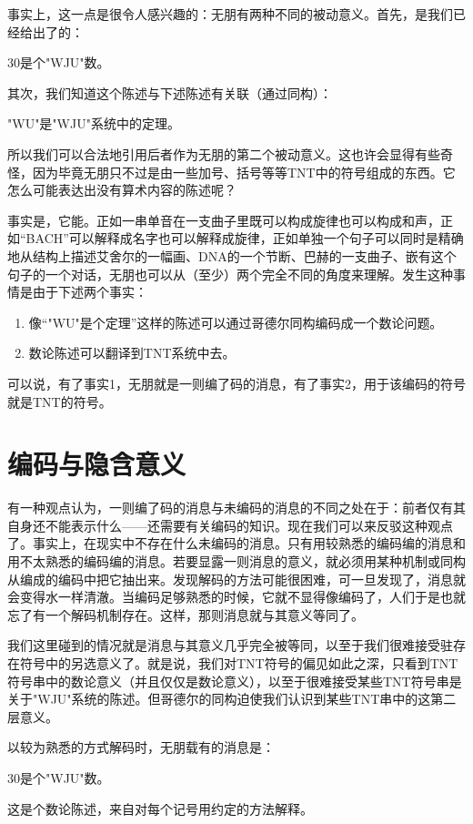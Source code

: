 事实上，这一点是很令人感兴趣的：无朋有两种不同的被动意义。首先，是我们已经给出了的：
\begin{center}
$30$是个"WJU"数。
\end{center}
其次，我们知道这个陈述与下述陈述有关联（通过同构）：
\begin{center}
"WU"是"WJU"系统中的定理。
\end{center}
所以我们可以合法地引用后者作为无朋的第二个被动意义。这也许会显得有些奇怪，因为毕竟无朋只不过是由一些加号、括号等等TNT中的符号组成的东西。它怎么可能表达出没有算术内容的陈述呢？

事实是，它能。正如一串单音在一支曲子里既可以构成旋律也可以构成和声，正如“BACH”可以解释成名字也可以解释成旋律，正如单独一个句子可以同时是精确地从结构上描述艾舍尔的一幅画、DNA的一个节断、巴赫的一支曲子、嵌有这个句子的一个对话，无朋也可以从（至少）两个完全不同的角度来理解。发生这种事情是由于下述两个事实：
\begin{enumerate}[labelindent=0pt, label=事实\arabic*, format=\textsf]
\item 像“"WU"是个定理”这样的陈述可以通过哥德尔同构编码成一个数论问题。
\item 数论陈述可以翻译到TNT系统中去。
\end{enumerate}
可以说，有了事实1，无朋就是一则编了码的消息，有了事实2，用于该编码的符号就是TNT的符号。

\section{编码与隐含意义}

有一种观点认为，一则编了码的消息与未编码的消息的不同之处在于：前者仅有其自身还不能表示什么——还需要有关编码的知识。现在我们可以来反驳这种观点了。事实上，在现实中不存在什么未编码的消息。只有用较熟悉的编码编的消息和用不太熟悉的编码编的消息。若要显露一则消息的意义，就必须用某种机制或同构从编成的编码中把它抽出来。发现解码的方法可能很困难，可一旦发现了，消息就会变得水一样清澈。当编码足够熟悉的时候，它就不显得像编码了，人们于是也就忘了有一个解码机制存在。这样，那则消息就与其意义等同了。

我们这里碰到的情况就是消息与其意义几乎完全被等同，以至于我们很难接受驻存在符号中的另选意义了。就是说，我们对TNT符号的偏见如此之深，只看到TNT符号串中的数论意义（并且仅仅是数论意义），以至于很难接受某些TNT符号串是关于"WJU"系统的陈述。但哥德尔的同构迫使我们认识到某些TNT串中的这第二层意义。

以较为熟悉的方式解码时，无朋载有的消息是：
\begin{center}
$30$是个"WJU"数。
\end{center}
这是个数论陈述，来自对每个记号用约定的方法解释。

